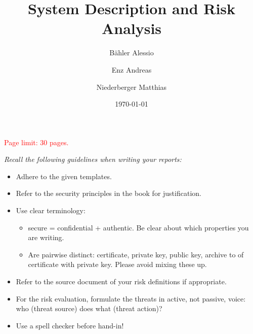 \documentclass[english]{article}
\date{\today}
\begin{document}
\title{\huge\sffamily\bfseries System Description and Risk Analysis}
\author[1]{B\"ahler Alessio}
\author[1]{Enz Andreas}
\author[1]{Niederberger Matthias}
\maketitle

\begin{center}
{\large\textcolor{red}{Page limit: 30 pages.}}
\end{center}

\tableofcontents
\pagebreak

\begin{framed}
\noindent
{\it
Recall the following guidelines when writing your reports:
\begin{itemize}
\item Adhere to the given templates.

\item Refer to the security principles in the book for justification.

\item Use clear terminology: 
\begin{itemize}
\item secure = confidential + authentic. Be clear about
which properties you are writing.
\item Are pairwise distinct: certificate, private key, public key, archive to of certificate with private key. Please avoid mixing these up.
\end{itemize}

\item Refer to the source document of your risk definitions if appropriate.

\item For the risk evaluation, formulate the threats in active, not passive, 
voice: who (threat source) does what (threat action)? 

\item Use a spell checker before hand-in!

\end{itemize}
}
\end{framed}
\end{document}
